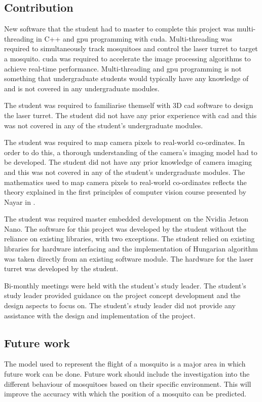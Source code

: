 \subsection{Contribution}
New software that the student had to master to complete this project was multi-threading in C++ and \gls{gpu} programming with \gls{cuda}. Multi-threading was required to simultaneously track mosquitoes and control the laser turret to target a mosquito. \gls{cuda} was required to accelerate the image processing algorithms to achieve real-time performance. Multi-threading and \gls{gpu} programming is not something that undergraduate students would typically have any knowledge of and is not covered in any undergraduate modules.

The student was required to familiarise themself with 3D \gls{cad} software to design the laser turret. The student did not have any prior experience with \gls{cad} and this was not covered in any of the student's undergraduate modules.

The student was required to map camera pixels to real-world co-ordinates. In order to do this, a thorough understanding of the camera's imaging model had to be developed. The student did not have any prior knowledge of camera imaging and this was not covered in any of the student's undergraduate modules. The mathematics used to map camera pixels to real-world co-ordinates reflects the theory explained in the first principles of computer vision course presented by Nayar in \cite{Nayar}.

The student was required master embedded development on the Nvidia Jetson Nano. The software for this project was developed by the student without the reliance on existing libraries, with two exceptions. The student relied on existing libraries for hardware interfacing and the implementation of Hungarian algorithm was taken directly from an existing software module. The hardware for the laser turret was developed by the student.

Bi-monthly meetings were held with the student's study leader. The student's study leader provided guidance on the project concept development and the design aspects to focus on. The student's study leader did not provide any assistance with the design and implementation of the project.


\subsection{Future work}
The model used to represent the flight of a mosquito is a major area in which future work can be done. Future work should include the investigation into the different behaviour of mosquitoes based on their specific environment. This will improve the accuracy with which the position of a mosquito can be predicted.

